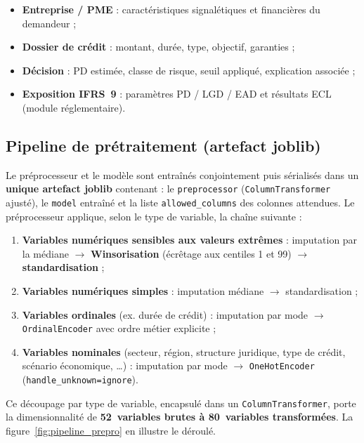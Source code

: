 \begin{itemize}
  \item \textbf{Entreprise / PME} : caractéristiques signalétiques et financières du
        demandeur ;
  \item \textbf{Dossier de crédit} : montant, durée, type, objectif, garanties ;
  \item \textbf{Décision} : PD estimée, classe de risque, seuil appliqué, explication
        associée ;
  \item \textbf{Exposition IFRS~9} : paramètres PD / LGD / EAD et résultats ECL
        (module réglementaire).
\end{itemize}

\subsection{Pipeline de prétraitement (artefact joblib)}

Le préprocesseur et le modèle sont entraînés conjointement puis sérialisés dans un
\textbf{unique artefact joblib} contenant : le \texttt{preprocessor}
(\texttt{ColumnTransformer} ajusté), le \texttt{model} entraîné et la liste
\texttt{allowed\_columns} des colonnes attendues. Le préprocesseur applique, selon le
type de variable, la chaîne suivante :

\begin{enumerate}
  \item \textbf{Variables numériques sensibles aux valeurs extrêmes} : imputation par
        la médiane $\rightarrow$ \textbf{Winsorisation} (écrêtage aux centiles 1 et 99)
        $\rightarrow$ \textbf{standardisation} ;
  \item \textbf{Variables numériques simples} : imputation médiane $\rightarrow$
        standardisation ;
  \item \textbf{Variables ordinales} (ex. durée de crédit) : imputation par mode
        $\rightarrow$ \texttt{OrdinalEncoder} avec ordre métier explicite ;
  \item \textbf{Variables nominales} (secteur, région, structure juridique, type de
        crédit, scénario économique, \dots) : imputation par mode $\rightarrow$
        \texttt{OneHotEncoder} (\texttt{handle\_unknown=ignore}).
\end{enumerate}

Ce découpage par type de variable, encapsulé dans un \texttt{ColumnTransformer},
porte la dimensionnalité de \textbf{52~variables brutes à 80~variables transformées}.
La figure~\ref{fig:pipeline_prepro} en illustre le déroulé.

